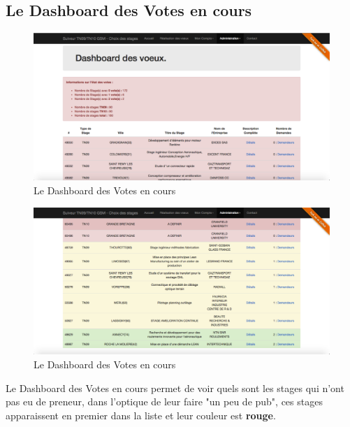 \documentclass[a4paper,titlepage]{scrartcl}
\begin{document}
\clearpage

\subsection{Le Dashboard des Votes en cours}

\begin{figure}[H]
	\vspace{-3mm}
	\begin{center}
		\includegraphics[scale=0.33]{Images/admin_dash1.png}
		\caption{Le Dashboard des Votes en cours}
	\end{center}
\end{figure}

\begin{figure}[H]
	\vspace{-3mm}
	\begin{center}
		\includegraphics[scale=0.33]{Images/admin_dash2.png}
		\caption{Le Dashboard des Votes en cours}
	\end{center}
\end{figure}

Le Dashboard des Votes en cours permet de voir quels sont les stages qui n'ont pas eu de preneur, dans l'optique de leur faire "un peu de pub", ces stages apparaissent en premier dans la liste et leur couleur est \textbf{rouge}.\\
\end{document}
